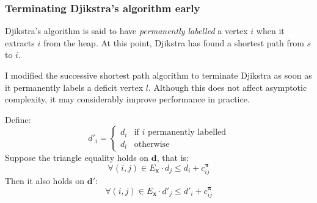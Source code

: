 \subsubsection{Terminating Djikstra's algorithm early}

Djikstra's algorithm is said to have \emph{permanently labelled} a vertex $i$ when it extracts $i$ from the heap. At this point, Djikstra has found a shortest path from $s$ to $i$.

I modified the successive shortest path algorithm to terminate Djikstra as soon as it permanently labels a deficit vertex $l$. Although this does not affect asymptotic complexity, it may considerably improve performance in practice.\\

\begin{lemma} \label{lemma:ssp-preserve-triangle}
    Define:
    \[
    d'_{i}=\begin{cases}
    d_{i} & \text{if $i$ permanently labelled}\\
    d_{l} & \text{otherwise}
    \end{cases}
    \]
    Suppose the triangle equality holds on $\mathbf{d}$, that is:
    \begin{equation} \label{eq:djikstra-triangle-assumption}
    \forall(i,j)\in E_{\mathbf{x}}\cdot d_j \leq d_i + c^{\boldsymbol{\pi}}_{ij}
    \end{equation}
    Then it also holds on $\mathbf{d}'$:
    \[\forall(i,j)\in E_{\mathbf{x}}\cdot d'_j \leq d'_i + c^{\boldsymbol{\pi}}_{ij}\]
\end{lemma}
